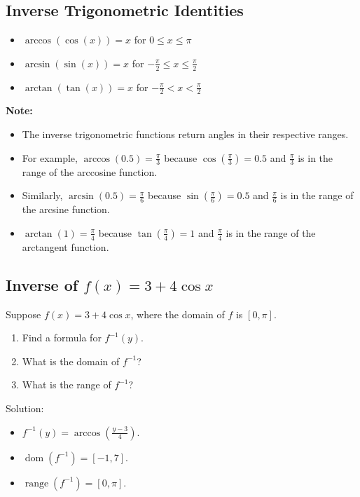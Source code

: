 \subsection{Inverse Trigonometric Identities}
\begin{itemize}
    \item $\arccos(\cos(x)) = x$ for $0 \leq x \leq \pi$
    \item $\arcsin(\sin(x)) = x$ for $-\frac{\pi}{2} \leq x \leq \frac{\pi}{2}$
    \item $\arctan(\tan(x)) = x$ for $-\frac{\pi}{2} < x < \frac{\pi}{2}$
\end{itemize}
\textbf{Note:}
\begin{itemize}
    \item The inverse trigonometric functions return angles in their respective ranges.
    \item For example, $\arccos(0.5) = \frac{\pi}{3}$ because $\cos(\frac{\pi}{3}) = 0.5$ and $\frac{\pi}{3}$ is in the range of the arccosine function.
    \item Similarly, $\arcsin(0.5) = \frac{\pi}{6}$ because $\sin(\frac{\pi}{6}) = 0.5$ and $\frac{\pi}{6}$ is in the range of the arcsine function.
    \item $\arctan(1) = \frac{\pi}{4}$ because $\tan(\frac{\pi}{4}) = 1$ and $\frac{\pi}{4}$ is in the range of the arctangent function.
\end{itemize}

\subsection{Inverse of $f(x)=3+4\cos x$}
Suppose $f(x)=3+4\cos x$, where the domain of $f$ is $[0,\pi]$.
\begin{enumerate}[]
  \item Find a formula for $f^{-1}(y)$.
  \item What is the domain of $f^{-1}$?
  \item What is the range of $f^{-1}$?
\end{enumerate}
Solution:
\begin{itemize}
  \item $f^{-1}(y)=\arccos\left(\frac{y-3}{4}\right)$.
  \item $\operatorname{dom}(f^{-1})=[-1,7]$.
  \item $\operatorname{range}(f^{-1})=[0,\pi]$.
\end{itemize}

